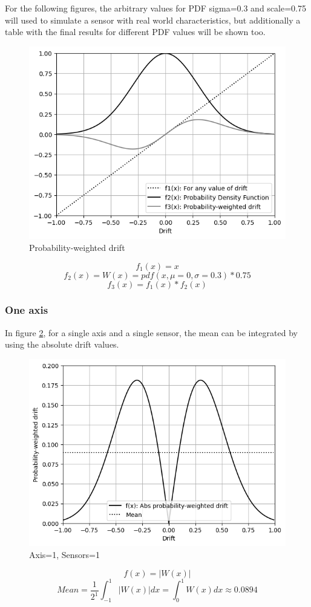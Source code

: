 \documentclass[10pt, twocolumn, a4paper]{article}
\begin{document}
            For the following figures, the arbitrary values for PDF sigma=0.3 and scale=0.75 will used to simulate a sensor with real world characteristics, but additionally a table with the final results for different PDF values will be shown too.
            \begin{figure}[H]
                \begin{center}
                    \caption{Probability-weighted drift}
                    \label{fig_zero_0}
                    \includegraphics[width=0.8\linewidth]{figure_drift_1a.png}
                \end{center}
            \end{figure}
            $$ f_1(x) = x $$
            $$ f_2(x) = W(x) = pdf(x, \mu=0, \sigma=0.3) * 0.75 $$
            $$ f_3(x) = f_1(x)*f_2(x) $$

        \subsubsection{One axis}
            In figure \ref{fig_zero_11}, for a single axis and a single sensor, the mean can be integrated by using the absolute drift values.
            \begin{figure}[H]
                \begin{center}
                    \caption{Axis=1, Sensors=1}
                    \label{fig_zero_11}
                    \includegraphics[width=0.8\linewidth]{figure_drift_1b.png}
                \end{center}
            \end{figure}
            \vspace{-8mm}
            $$ f(x) = |W(x)| $$
            $$ Mean = \frac{1}{2^1} \int_{-1}^1 |W(x)| dx = \int_0^1 W(x) dx \approx 0.0894 $$
\end{document}
